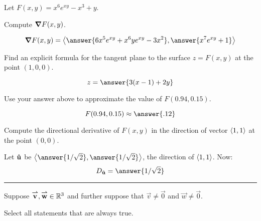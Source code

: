 \documentclass{ximera}
\author{Darry Andrews and Bart Snapp}
\begin{document}
Let $F(x,y)=x^6 e^{xy} -x^3+y$.

\begin{problem}
  Compute $\boldsymbol\nabla F(x,y)$.
  \begin{prompt}
    \[
    \grad F(x,y) = \vector{\answer{6x^5e^{xy}+x^6 y e^{xy}-3x^2},\answer{x^7e^{xy}+1}}
    \]
  \end{prompt}
  \vfill
  
\end{problem}

\begin{problem}
  Find an explicit formula for the tangent plane to the surface $z =
  F(x,y)$ at the point $(1,0,0)$.
  \begin{prompt}
  \[
  z = \answer{3(x-1) + 2y}
  \]
  \end{prompt}

  \vfill

\end{problem}


\begin{problem}
  Use your answer above to approximate the value of $F(0.94, 0.15)$.
  \begin{prompt}
    \[
    F(0.94, 0.15)\approx \answer{.12}
    \]
  \end{prompt}

  \vfill
  
\end{problem}


\begin{problem}
  Compute the directional derivative of $F(x,y)$ in the direction of
  vector $\left\langle 1,1\right\rangle$ at the point $(0,0)$.
  \begin{prompt}
    Let $\mathbf{\hat{u}}$ be
    $\vector{\answer{1/\sqrt{2}},\answer{1/\sqrt{2}}}$, the direction
    of $\left\langle 1,1\right\rangle$. Now:
    \[
    D_{\uvec{u}} = \answer{1/\sqrt{2}}
    \]
  \end{prompt}

  \vfill
  
\end{problem}

\hrule

\begin{problem}
  Suppose ${\overset{\boldsymbol{\rightharpoonup}}{\mathbf{v}}}, {\overset{\boldsymbol{\rightharpoonup}}{\mathbf{w}}} \in \mathbb R^3$ and further suppose that $\vec{v} \neq \vec{0}$ and $\vec{w} \neq \vec{0}$.
  \begin{prompt}
    Select all statements that are always true.
  \end{prompt}
  
  \begin{selectAll}
  \end{selectAll}
\end{problem}
\end{document}
